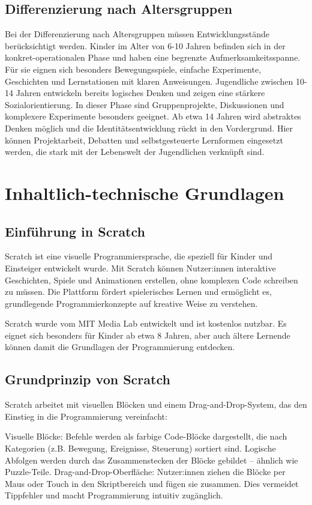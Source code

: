 \subsection{Differenzierung nach Altersgruppen}
\label{sec:Differenzierung nach Altersgruppen}
Bei der Differenzierung nach Altersgruppen müssen Entwicklungsstände berücksichtigt werden. Kinder im Alter von 6-10 Jahren befinden sich in der konkret-operationalen Phase und haben eine begrenzte Aufmerksamkeitsspanne. Für sie eignen sich besonders Bewegungsspiele, einfache Experimente, Geschichten und Lernstationen mit klaren Anweisungen. Jugendliche zwischen 10-14 Jahren entwickeln bereits logisches Denken und zeigen eine stärkere Sozialorientierung. In dieser Phase sind Gruppenprojekte, Diskussionen und komplexere Experimente besonders geeignet. Ab etwa 14 Jahren wird abstraktes Denken möglich und die Identitätsentwicklung rückt in den Vordergrund. Hier können Projektarbeit, Debatten und selbstgesteuerte Lernformen eingesetzt werden, die stark mit der Lebenswelt der Jugendlichen verknüpft sind.


\section{Inhaltlich-technische Grundlagen}
\label{sec:Inhaltlich-technische Grundlagen}
\subsection{Einführung in Scratch}
\label{Einführung in Scratch}
Scratch ist eine visuelle Programmiersprache, die speziell für Kinder und Einsteiger entwickelt wurde. Mit Scratch können Nutzer:innen interaktive Geschichten, Spiele und Animationen erstellen, ohne komplexen Code schreiben zu müssen. Die Plattform fördert spielerisches Lernen und ermöglicht es, grundlegende Programmierkonzepte auf kreative Weise zu verstehen.

Scratch wurde vom MIT Media Lab entwickelt und ist kostenlos nutzbar. Es eignet sich besonders für Kinder ab etwa 8 Jahren, aber auch ältere Lernende können damit die Grundlagen der Programmierung entdecken.
\subsection{Grundprinzip von Scratch}
\label{sec:Grundprinzip von Scratch}
Scratch arbeitet mit visuellen Blöcken und einem Drag-and-Drop-System, das den Einstieg in die Programmierung vereinfacht:

Visuelle Blöcke:
Befehle werden als farbige Code-Blöcke dargestellt, die nach Kategorien (z.B. Bewegung, Ereignisse, Steuerung) sortiert sind.
Logische Abfolgen werden durch das Zusammenstecken der Blöcke gebildet – ähnlich wie Puzzle-Teile.
Drag-and-Drop-Oberfläche:
Nutzer:innen ziehen die Blöcke per Maus oder Touch in den Skriptbereich und fügen sie zusammen.
Dies vermeidet Tippfehler und macht Programmierung intuitiv zugänglich.

